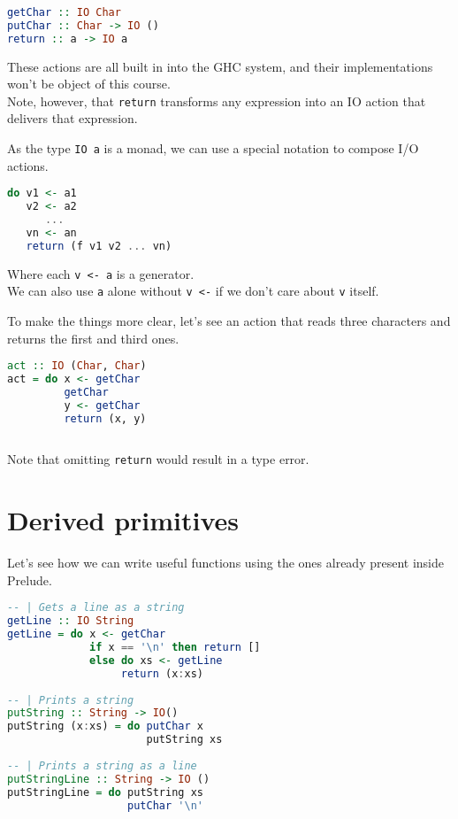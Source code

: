 \begin{lstlisting}[language=haskell]
getChar :: IO Char
putChar :: Char -> IO ()
return :: a -> IO a
\end{lstlisting}

These actions are all built in into the GHC system, and their implementations won't be object of this course. \\
Note, however, that \texttt{return} transforms any expression into an IO action that delivers that expression.
\linebreak \linebreak

As the type \texttt{IO a} is a monad, we can use a special notation to compose I/O actions.

\begin{lstlisting}[language=haskell]
do v1 <- a1
   v2 <- a2
      ...
   vn <- an
   return (f v1 v2 ... vn)
\end{lstlisting}

Where each \texttt{v <- a} is a generator. \\
We can also use \texttt{a} alone without \texttt{v <-} if we don't care about \texttt{v} itself.
\linebreak \linebreak

To make the things more clear, let's see an action that reads three characters and returns the first and third ones. 

\begin{lstlisting}[language=haskell]
act :: IO (Char, Char)
act = do x <- getChar
         getChar
         y <- getChar
         return (x, y)
      
\end{lstlisting}

Note that omitting \texttt{return} would result in a type error.

\section{Derived primitives}
Let's see how we can write useful functions using the ones already present inside Prelude.

\begin{lstlisting}[language=haskell]
-- | Gets a line as a string
getLine :: IO String
getLine = do x <- getChar
             if x == '\n' then return []
             else do xs <- getLine
                  return (x:xs)
                  
-- | Prints a string
putString :: String -> IO()
putString (x:xs) = do putChar x 
                      putString xs
                      
-- | Prints a string as a line
putStringLine :: String -> IO ()
putStringLine = do putString xs
                   putChar '\n'
\end{lstlisting}

